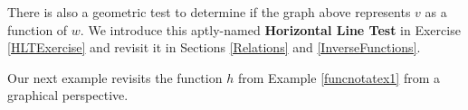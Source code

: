 \documentclass{ximera}
\begin{document}


There is also a geometric test to determine if the graph above represents $v$ as a function of $w$.  We introduce this aptly-named  \textbf{Horizontal Line Test} in Exercise \ref{HLTExercise} and revisit it in Sections \ref{Relations} and \ref{InverseFunctions}.  

 

Our next example revisits the function $h$ from Example \ref{funcnotatex1} from a graphical perspective.
\end{document}

